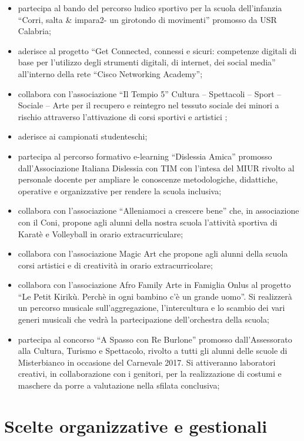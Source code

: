 \documentclass[12pt,a4paper,oneside]{memoir}
\begin{document}
\begin{itemize}
    \item partecipa al bando del percorso ludico sportivo per la scuola dell'infanzia ``Corri, salta \& impara2- un girotondo di movimenti'' promosso da USR Calabria;
    \item aderisce al progetto ``Get Connected, connessi e sicuri: competenze digitali di base per l'utilizzo degli strumenti digitali, di internet, dei social media'' all'interno della rete ``Cisco Networking Academy'';
    \item collabora con l'associazione ``Il Tempio 5'' Cultura – Spettacoli – Sport – Sociale – Arte per il recupero e reintegro nel tessuto sociale dei minori a rischio attraverso l'attivazione di corsi sportivi e artistici ;
    \item aderisce ai campionati studenteschi;
    \item partecipa al percorso formativo e-learning ``Dislessia Amica'' promosso dall'Associazione Italiana Dislessia con TIM con l'intesa del MIUR rivolto al personale docente per ampliare le conoscenze metodologiche, didattiche, operative e organizzative per rendere la scuola inclusiva;
    \item collabora con   l'associazione ``Alleniamoci a crescere bene'' che, in associazione con il Coni, propone agli alunni della nostra scuola l'attività sportiva di Karatè e  Volleyball in orario extracurriculare;
    \item collabora con l'associazione Magic Art che propone agli alunni della scuola corsi artistici e di creatività in orario extracurricolare;
    \item collabora con l'associazione Afro Family Arte in Famiglia Onlus al progetto ``Le Petit Kirikù. Perchè in ogni bambino c'è un grande uomo''.  Si realizzerà un percorso musicale sull'aggregazione, l'intercultura e lo scambio dei vari generi musicali che vedrà la  partecipazione dell'orchestra della scuola;
    \item partecipa al concorso ``A Spasso con Re Burlone'' promosso dall'Assessorato alla Cultura, Turismo e Spettacolo, rivolto a tutti gli alunni delle scuole di Misterbianco in occasione del Carnevale 2017. Si attiveranno laboratori creativi, in collaborazione con i genitori, per la realizzazione di costumi e maschere da porre a valutazione nella sfilata conclusiva;
\end{itemize}


\chapter{Scelte organizzative e gestionali}
\end{document}
